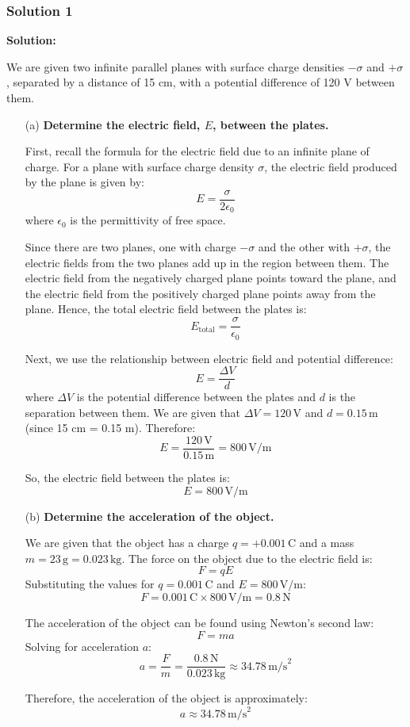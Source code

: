 \documentclass{article}
\begin{document}
\subsubsection{Solution 1}
\textbf{Solution:}

We are given two infinite parallel planes with surface charge densities $-\sigma$ and $+\sigma$, separated by a distance of 15 cm, with a potential difference of 120 V between them. 

\begin{enumerate}
    \item[(a)] \textbf{Determine the electric field, $E$, between the plates.}

    First, recall the formula for the electric field due to an infinite plane of charge. For a plane with surface charge density $\sigma$, the electric field produced by the plane is given by:
    \[
    E = \frac{\sigma}{2\epsilon_0}
    \]
    where $\epsilon_0$ is the permittivity of free space.

    Since there are two planes, one with charge $-\sigma$ and the other with $+\sigma$, the electric fields from the two planes add up in the region between them. The electric field from the negatively charged plane points toward the plane, and the electric field from the positively charged plane points away from the plane. Hence, the total electric field between the plates is:
    \[
    E_{\text{total}} = \frac{\sigma}{\epsilon_0}
    \]

    Next, we use the relationship between electric field and potential difference:
    \[
    E = \frac{\Delta V}{d}
    \]
    where $\Delta V$ is the potential difference between the plates and $d$ is the separation between them. We are given that $\Delta V = 120 \, \text{V}$ and $d = 0.15 \, \text{m}$ (since 15 cm = 0.15 m). Therefore:
    \[
    E = \frac{120 \, \text{V}}{0.15 \, \text{m}} = 800 \, \text{V/m}
    \]

    So, the electric field between the plates is:
    \[
    E = 800 \, \text{V/m}
    \]

    \item[(b)] \textbf{Determine the acceleration of the object.}

    We are given that the object has a charge $q = +0.001 \, \text{C}$ and a mass $m = 23 \, \text{g} = 0.023 \, \text{kg}$. The force on the object due to the electric field is:
    \[
    F = qE
    \]
    Substituting the values for $q = 0.001 \, \text{C}$ and $E = 800 \, \text{V/m}$:
    \[
    F = 0.001 \, \text{C} \times 800 \, \text{V/m} = 0.8 \, \text{N}
    \]

    The acceleration of the object can be found using Newton’s second law:
    \[
    F = ma
    \]
    Solving for acceleration $a$:
    \[
    a = \frac{F}{m} = \frac{0.8 \, \text{N}}{0.023 \, \text{kg}} \approx 34.78 \, \text{m/s}^2
    \]

    Therefore, the acceleration of the object is approximately:
    \[
    a \approx 34.78 \, \text{m/s}^2
    \]
\end{enumerate}
\end{document}
